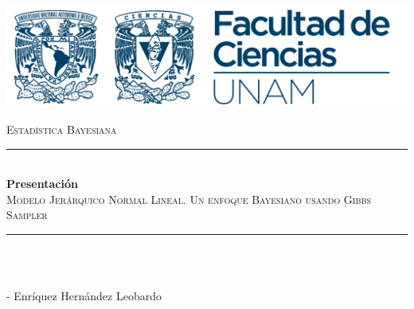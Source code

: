 \begin{titlepage}
	
	\newcommand{\HRule}{\rule{\linewidth}{0.5mm}} %
	
	\center %
	
	\includegraphics[]{logoFC_UNAM.png}\\ %
	
	\hspace*{2cm}

	\textsc{\large  Estadística Bayesiana}\\[1.5cm] 
	
	
	\HRule \\[0.4cm]
	{ \Large \bfseries Presentación}\\[0.4cm] %
	\textsc{\Large Modelo Jerárquico Normal Lineal. Un enfoque Bayesiano usando Gibbs Sampler}\\[1cm] %
	\HRule \\[1.2cm]
	
	
	\begin{minipage}{0.4\textwidth}
		\begin{flushleft} \large
			\emph{}\\
- Enríquez Hernández Leobardo\\
		\end{flushleft}
	\end{minipage}
	~


\end{titlepage}
